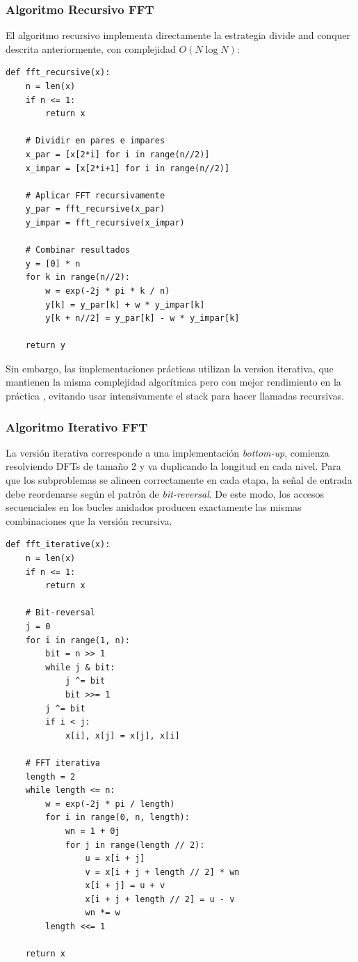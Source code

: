 \documentclass[a4paper]{article}
\begin{document}
\subsubsection{Algoritmo Recursivo FFT}

El algoritmo recursivo implementa directamente la estrategia divide and conquer descrita anteriormente, con complejidad $O(N \log N)$:

\begin{verbatim}
def fft_recursive(x):
    n = len(x)
    if n <= 1:
        return x
    
    # Dividir en pares e impares
    x_par = [x[2*i] for i in range(n//2)]
    x_impar = [x[2*i+1] for i in range(n//2)]
    
    # Aplicar FFT recursivamente
    y_par = fft_recursive(x_par)
    y_impar = fft_recursive(x_impar)
    
    # Combinar resultados
    y = [0] * n
    for k in range(n//2):
        w = exp(-2j * pi * k / n)
        y[k] = y_par[k] + w * y_impar[k]
        y[k + n//2] = y_par[k] - w * y_impar[k]
    
    return y
\end{verbatim}

Sin embargo, las implementaciones prácticas utilizan la version iterativa, que mantienen la misma complejidad algorítmica pero con mejor rendimiento en la práctica \cite{duhamel1990fast}, evitando usar intensivamente el stack para hacer llamadas recursivas.

\subsubsection{Algoritmo Iterativo FFT}

La versión iterativa corresponde a una implementación \textit{bottom-up}, comienza resolviendo DFTs de tamaño 2 y va duplicando la longitud en cada nivel. Para que los subproblemas se alineen correctamente en cada etapa, la señal de entrada debe reordenarse según el patrón de \textit{bit-reversal}. De este modo, los accesos secuenciales en los bucles anidados producen exactamente las mismas combinaciones que la versión recursiva.

\begin{verbatim}
def fft_iterative(x):
    n = len(x)
    if n <= 1:
        return x
    
    # Bit-reversal
    j = 0
    for i in range(1, n):
        bit = n >> 1
        while j & bit:
            j ^= bit
            bit >>= 1
        j ^= bit
        if i < j:
            x[i], x[j] = x[j], x[i]
    
    # FFT iterativa
    length = 2
    while length <= n:
        w = exp(-2j * pi / length)
        for i in range(0, n, length):
            wn = 1 + 0j
            for j in range(length // 2):
                u = x[i + j]
                v = x[i + j + length // 2] * wn
                x[i + j] = u + v
                x[i + j + length // 2] = u - v
                wn *= w
        length <<= 1
    
    return x
\end{verbatim}
\end{document}
